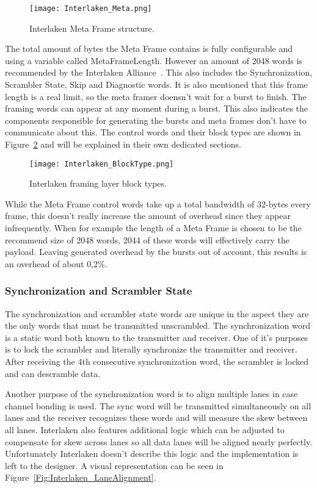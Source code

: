 	\begin{figure}[H]
		\centering
		\texttt{[image: Interlaken\_Meta.png]}	
		\caption{Interlaken Meta Frame structure.}
		\label{Fig:Interlaken_MetaFrame}
	\end{figure}
	
	The total amount of bytes the Meta Frame contains is fully configurable and using a variable called MetaFrameLength. However an amount of 2048 words is recommended by the Interlaken Alliance~\cite{InterlakenRecommendations}. This also includes the Synchronization, Scrambler State, Skip and Diagnostic words. It is also mentioned that this frame length is a real limit, so the meta framer doensn't wait for a burst to finish. The framing words can appear at any moment during a burst. This also indicates the components responsible for generating the bursts and meta frames don't have to communicate about this.
	The control words and their block types are shown in Figure~\ref{Fig:Interlaken_BlockTypes} and will be explained in their own dedicated sections.
	
	\begin{figure}[H]
		\centering
		\texttt{[image: Interlaken\_BlockType.png]}	
		\caption{Interlaken framing layer block types.}
		\label{Fig:Interlaken_BlockTypes}
	\end{figure}
	
	While the Meta Frame control words take up a total bandwidth of 32-bytes every frame, this doesn't really increase the amount of overhead since they appear infrequently. When for example the length of a Meta Frame is chosen to be the recommend size of 2048 words, 2044 of these words will effectively carry the payload. Leaving generated overhead by the bursts out of account, this results is an overhead of about 0,2\%.
	
	\subsubsection{Synchronization and Scrambler State}
	The synchronization and scrambler state words are unique in the aspect they are the only words that must be transmitted unscrambled. The synchronization word is a static word both known to the transmitter and receiver. One of it's purposes is to lock the scrambler and literally synchronize the transmitter and receiver. After receiving the 4th consecutive synchronization word, the scrambler is locked and can descramble data. 
	
	Another purpose of the synchronization word is to align multiple lanes in case channel bonding is used. The sync word will be transmitted simultaneously on all lanes and the receiver recognizes these words and will measure the skew between all lanes. Interlaken also features additional logic which can be adjusted to compensate for skew across lanes so all data lanes will be aligned nearly perfectly. Unfortunately Interlaken doesn't describe this logic and the implementation is left to the designer. A visual representation can be seen in Figure~\ref{Fig:Interlaken_LaneAlignment}.
	
